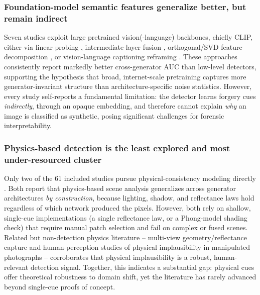 \documentclass[sn-mathphys-num,Numbered,pdflatex]{sn-jnl}
\begin{document}
\subsubsection{Foundation-model semantic features generalize better, but remain indirect}
Seven studies exploit large pretrained vision(-language) backbones, chiefly CLIP, either via linear probing \cite{TowardsUniversal19}, intermediate-layer fusion \cite{LeveragingRepresentations23}, orthogonal/SVD feature decomposition \cite{OrthogonalSubspace22}, or vision-language captioning reframing \cite{BiloraA25}. These approaches consistently report markedly better cross-generator AUC than low-level detectors, supporting the hypothesis that broad, internet-scale pretraining captures more generator-invariant structure than architecture-specific noise statistics. However, every study self-reports a fundamental limitation: the detector learns forgery cues \emph{indirectly}, through an opaque embedding, and therefore cannot explain \emph{why} an image is classified as synthetic, posing significant challenges for forensic interpretability.

\subsubsection{Physics-based detection is the least explored and most under-resourced cluster}
Only two of the 61 included studies pursue physical-consistency modeling directly \cite{Light2lieDetecting2,DigitalImage42}. Both report that physics-based scene analysis generalizes across generator architectures \emph{by construction}, because lighting, shadow, and reflectance laws hold regardless of which network produced the pixels. However, both rely on shallow, single-cue implementations (a single reflectance law, or a Phong-model shading check) that require manual patch selection and fail on complex or fused scenes. Related but non-detection physics literature -- multi-view geometry/reflectance capture \cite{Deep3DCaptureExcluded} and human-perception studies of physical implausibility in manipulated photographs \cite{CanPeopleExcluded} -- corroborates that physical implausibility is a robust, human-relevant detection signal. Together, this indicates a substantial gap: physical cues offer theoretical robustness to domain shift, yet the literature has rarely advanced beyond single-cue proofs of concept.
\end{document}
